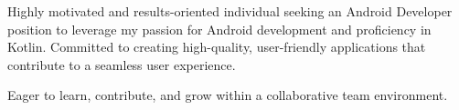 \begin{cvparagraph}

Highly motivated and results-oriented individual seeking an Android Developer position to leverage my passion for Android development and proficiency in Kotlin.
Committed to creating high-quality, user-friendly applications that contribute to a seamless user experience.


Eager to learn, contribute, and grow within a collaborative team environment.

\end{cvparagraph}
